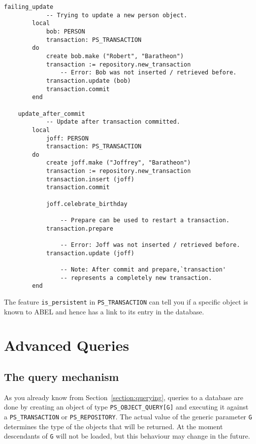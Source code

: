 \documentclass[a4paper,12pt]{report}
\begin{document}
\begin{lstlisting}[language=OOSC2Eiffel, captionpos=b, caption={Common pitfalls with update.}, label={lst:failing_update_delete}]
	failing_update
			-- Trying to update a new person object.
		local
			bob: PERSON
			transaction: PS_TRANSACTION
		do
			create bob.make ("Robert", "Baratheon")
			transaction := repository.new_transaction
				-- Error: Bob was not inserted / retrieved before.
			transaction.update (bob)
			transaction.commit
		end

	update_after_commit
			-- Update after transaction committed.
		local
			joff: PERSON
			transaction: PS_TRANSACTION
		do
			create joff.make ("Joffrey", "Baratheon")
			transaction := repository.new_transaction
			transaction.insert (joff)
			transaction.commit

			joff.celebrate_birthday

				-- Prepare can be used to restart a transaction.
			transaction.prepare

				-- Error: Joff was not inserted / retrieved before.
			transaction.update (joff)
			
				-- Note: After commit and prepare,`transaction'
				-- represents a completely new transaction.
		end
\end{lstlisting}


The feature \lstinline{is_persistent} in \lstinline!PS_TRANSACTION! can tell you if a specific object is known to ABEL and hence has a link to its entry in the database.

\chapter{Advanced Queries}
\label{sec:advanced_queries}

\section{The query mechanism}

As you already know from Section~\ref{section:querying}, queries to a database are done by creating an object of type  \lstinline!PS_OBJECT_QUERY[G]! 
and executing it against a \lstinline!PS_TRANSACTION! or \lstinline!PS_REPOSITORY!.
The actual value of the generic parameter \lstinline!G! determines the type of the objects that will be returned.
At the moment descendants of \lstinline!G! will not be loaded, but this behaviour may change in the future.
\end{document}
